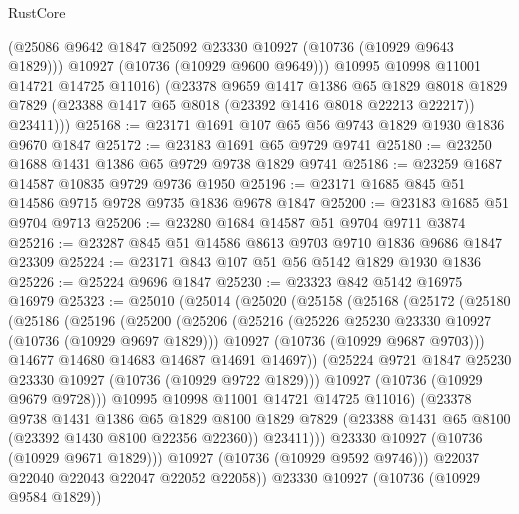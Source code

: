 \begin{lexlean}{RustCore}
\begin{coremodule}
            (@25086 @9642 @1847 @25092 @23330 @10927 (@10736 (@10929 @9643 @1829)))
            @10927
            (@10736 (@10929 @9600 @9649)))
          @10995
          @10998
          @11001
          @14721
          @14725
          @11016)
        (@23378
          @9659
          @1417
          @1386
          @65
          @1829
          @8018
          @1829
          @7829
          (@23388 @1417 @65 @8018 (@23392 @1416 @8018 @22213 @22217))
          @23411)))
@25168 := @23171 @1691 @107 @65 @56 @9743 @1829 @1930 @1836 @9670 @1847
@25172 := @23183 @1691 @65 @9729 @9741
@25180 := @23250 @1688 @1431 @1386 @65 @9729 @9738 @1829 @9741
@25186 := @23259 @1687 @14587 @10835 @9729 @9736 @1950
@25196 := @23171 @1685 @845 @51 @14586 @9715 @9728 @9735 @1836 @9678 @1847
@25200 := @23183 @1685 @51 @9704 @9713
@25206 := @23280 @1684 @14587 @51 @9704 @9711 @3874
@25216 := @23287 @845 @51 @14586 @8613 @9703 @9710 @1836 @9686 @1847 @23309
@25224 := @23171 @843 @107 @51 @56 @5142 @1829 @1930 @1836
@25226 := @25224 @9696 @1847
@25230 := @23323 @842 @5142 @16975 @16979
@25323 := @25010
    (@25014
      (@25020
        (@25158
          (@25168
            (@25172
              (@25180
                (@25186
                  (@25196
                    (@25200
                      (@25206
                        (@25216
                          (@25226 @25230 @23330 @10927 (@10736 (@10929 @9697 @1829)))
                          @10927
                          (@10736 (@10929 @9687 @9703)))
                        @14677
                        @14680
                        @14683
                        @14687
                        @14691
                        @14697))
                    (@25224 @9721 @1847 @25230 @23330 @10927 (@10736 (@10929 @9722 @1829)))
                    @10927
                    (@10736 (@10929 @9679 @9728)))
                  @10995
                  @10998
                  @11001
                  @14721
                  @14725
                  @11016)
                (@23378
                  @9738
                  @1431
                  @1386
                  @65
                  @1829
                  @8100
                  @1829
                  @7829
                  (@23388 @1431 @65 @8100 (@23392 @1430 @8100 @22356 @22360))
                  @23411)))
            @23330
            @10927
            (@10736 (@10929 @9671 @1829)))
          @10927
          (@10736 (@10929 @9592 @9746)))
        @22037
        @22040
        @22043
        @22047
        @22052
        @22058))
    @23330
    @10927
    (@10736 (@10929 @9584 @1829))

\end{coremodule}
\end{lexlean}
